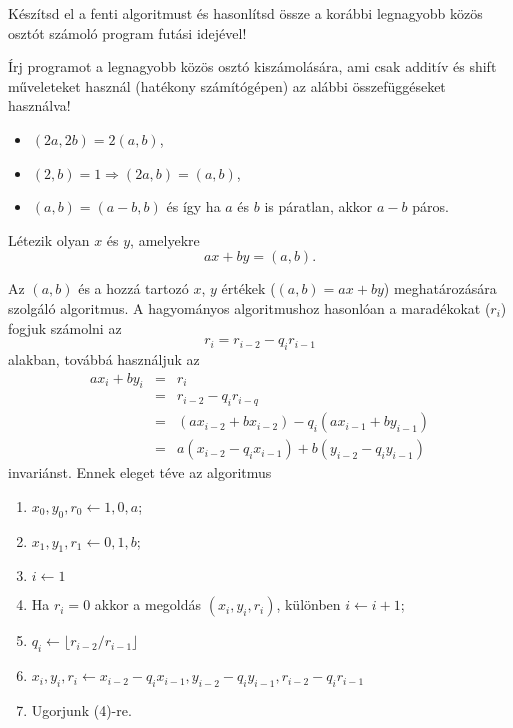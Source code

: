 \begin{exercise}
  Készítsd el a fenti algoritmust és hasonlítsd össze a korábbi legnagyobb
  közös osztót számoló program futási idejével!
\end{exercise}

\begin{exercise} Írj programot a legnagyobb közös osztó kiszámolására, ami
  csak additív és shift műveleteket használ (hatékony
  számítógépen) az alábbi összefüggéseket használva!
  \begin{itemize}
    \item $(2a,2b) = 2(a,b)$,
    \item $(2,b)=1 \Rightarrow (2a,b) = (a,b)$,
    \item $(a,b) = (a-b,b)$ és így ha $a$ és $b$ is páratlan, akkor $a-b$
      páros.
  \end{itemize}
\end{exercise}

\begin{theorem}
  Létezik olyan $x$ és $y$, amelyekre \[ ax+by=(a,b). \]
\end{theorem}

\begin{definition}
  Az $(a,b)$ és a hozzá tartozó $x$, $y$ értékek ($(a,b)=ax+by$) meghatározására szolgáló
  algoritmus. A hagyományos algoritmushoz hasonlóan a maradékokat ($r_i$)
  fogjuk számolni az \[r_i = r_{i-2} - q_ir_{i-1}\] alakban, továbbá használjuk
  az \[
    \begin{array}{rcl}
      ax_i+by_i & = & r_i \\
                & = & r_{i-2} - q_ir_{i-q} \\
                & = & (ax_{i-2} + bx_{i-2}) - q_i(ax_{i-1} + by_{i-1}) \\
                & = & a(x_{i-2} - q_ix_{i-1}) + b(y_{i-2} - q_iy_{i-1})
    \end{array}
  \] invariánst. Ennek eleget téve az algoritmus
  \begin{enumerate}
    \item $x_0, y_0, r_0 \leftarrow 1, 0, a$;
    \item $x_1, y_1, r_1 \leftarrow 0, 1, b$;
    \item $i \leftarrow 1$
    \item Ha $r_i = 0$ akkor a megoldás $(x_i,y_i,r_i)$, különben $i\leftarrow i+1$;
    \item $q_i \leftarrow \lfloor r_{i-2}/r_{i-1}\rfloor$
    \item $x_i, y_i, r_i \leftarrow x_{i-2}-q_ix_{i-1}, y_{i-2}-q_iy_{i-1},
      r_{i-2}-q_ir_{i-1}$
    \item Ugorjunk (4)-re.
  \end{enumerate}
\end{definition}

